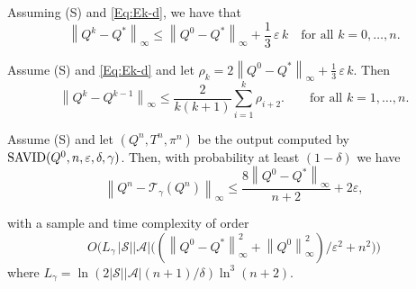 \documentclass[10pt,a4paper]{amsart}
\newcommand{\T}{\mathcal{T}}
\newcommand{\cA}{\mathcal{A}}
\newcommand{\cS}{\mathcal{S}}
\newcommand*{\infn}[1]{\left\|{#1}\right\|_{\infty}}
\begin{document}
\begin{lemma}\label{Le:uno-d}Assuming \mbox{\sc (S)} and \eqref{Eq:Ek-d}, we have that 
$$\infn{Q^k-Q^*}\leq \infn{Q^0-Q^*}+\frac{1}{3}\,\varepsilon\,k \quad \text{for all} \,\, k=0,\ldots,n.$$
\end{lemma}

\begin{lemma}\label{Le:dos-d} Assume \mbox{\sc (S)} and \eqref{Eq:Ek-d} and let $\rho_k=2\infn{Q^0-Q^*}+\frac{1}{3}\,\varepsilon\,k$. Then 
$$\infn{Q^{k}-Q^{k-1}} \le \frac{2}{k(k+1)}\sum_{i=1}^{k}\rho_{i+2}.\quad \quad \text{for all} \,\, k=1,\ldots,n.$$
\end{lemma}

\begin{theorem}\label{thm:err-d}
Assume \mbox{\sc (S)} and let $(Q^n,T^n,\pi^n)$ be the output computed by $\mbox{\rm SAVID}(Q^0,n,\varepsilon,\delta, \gamma)$. Then, with probability at least $(1-\delta)$ we have
\vspace{-1ex}
$$  \infn{Q^n-\T_\gamma(Q^n)}\leq \frac{8\infn{Q^0-Q^*}}{n+2}+2\varepsilon,$$

\vspace{-2ex}
with a sample and time complexity of order $${O}\big(L_\gamma\,|\cS||\cA|\big(({\infn{Q^0-Q^*}^{2}+\infn{Q^0}^{2}})/{\varepsilon^{2}}+n^2\big)\big)$$ 
where  
$L_\gamma=\ln(2|\cS||\cA|(n+1)/\delta)\ln^3(n+2)$.
\end{theorem}
\end{document}
